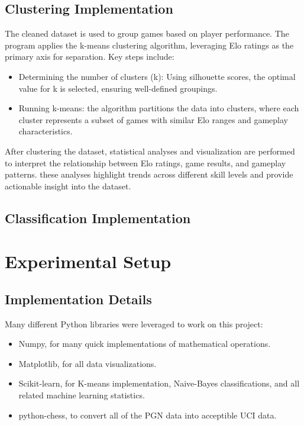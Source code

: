 \documentclass[conference]{IEEEtran}
\begin{document}
\subsection{Clustering Implementation}
 The cleaned dataset is used to group games based on player performance. The program applies the k-means clustering algorithm, leveraging Elo ratings as the primary axis for separation. Key steps include:
\begin{itemize}
    \item Determining the number of clusters (k): Using silhouette scores, the optimal value for k is selected, ensuring well-defined groupings.
    \item Running k-means: the algorithm partitions the data into clusters, where each cluster represents a subset of games with similar Elo ranges and gameplay characteristics.
\end{itemize}

After clustering the dataset, statistical analyses and visualization are performed to interpret the relationship between Elo ratings, game results, and gameplay patterns. these analyses highlight trends across different skill levels and provide actionable insight into the dataset.
\subsection{Classification Implementation}


\section{Experimental Setup}

\subsection{Implementation Details}
Many different Python libraries were leveraged to work on this project:
\begin{itemize}
\item Numpy, for many quick implementations of mathematical operations.
\item Matplotlib, for all data visualizations.
\item Scikit-learn, for K-means implementation, Naive-Bayes classifications, and all related machine learning statistics.
\item python-chess, to convert all of the PGN data into acceptible UCI data.
\end{itemize}
\end{document}
